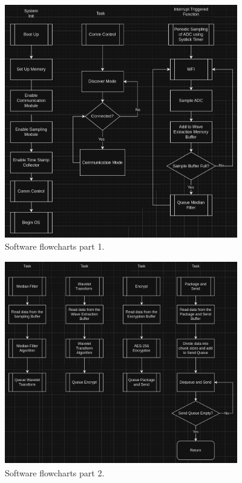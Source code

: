 \documentclass{article}
\begin{document}
\begin{figure}[h]
    \centering
    \includegraphics[width=4in, height=4in]{flow1.png}
    \caption{Software flowcharts part 1.}
\end{figure}

\begin{figure}[h]
    \centering
    \includegraphics[width=4in, height=3.5in]{flow2.png}
    \caption{Software flowcharts part 2.}
\end{figure}

\newpage
\end{document}
